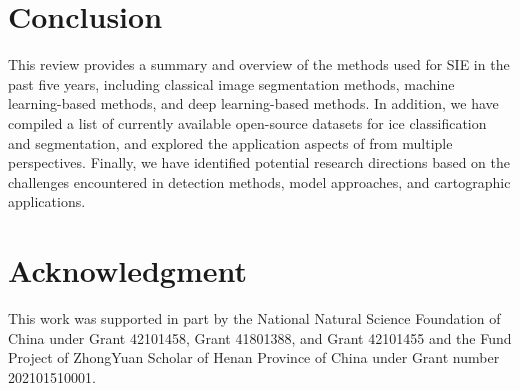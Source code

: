 \section{Conclusion}
This review provides a summary and overview of the methods used for SIE in the past five years, including classical image segmentation methods, machine learning-based methods, and deep learning-based methods. In addition, we have compiled a list of currently available open-source datasets for ice classification and segmentation, and explored the application aspects of from multiple perspectives. Finally, we have identified potential research directions based on the challenges encountered in detection methods, model approaches, and cartographic applications.

\section*{Acknowledgment}
This work was supported in part by the National Natural Science Foundation of China under Grant 42101458, Grant 41801388, and Grant 42101455 and the Fund Project of ZhongYuan Scholar of Henan Province of China under Grant number 202101510001.





%

